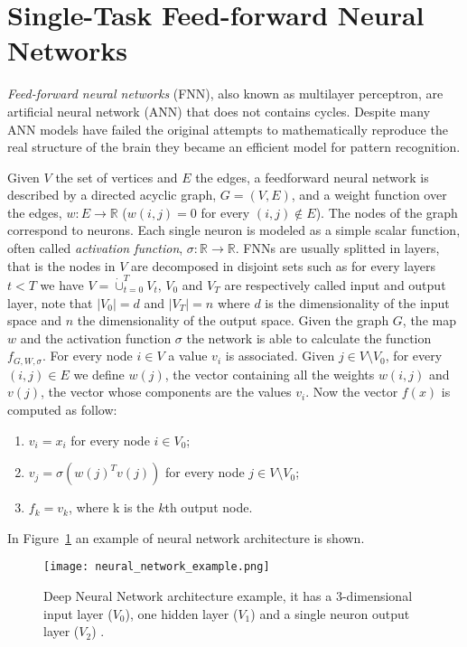 \section{Single-Task Feed-forward Neural Networks} \label{sec:singletaskNN}
\emph{Feed-forward neural networks} (FNN), also known as multilayer perceptron, are artificial neural network (ANN) that does not contains cycles. Despite many ANN models have failed the original attempts to mathematically reproduce the real structure of the brain they became an efficient model for pattern recognition. 

Given $V$ the set of vertices and $E$ the edges, a feedforward neural network is described by a directed acyclic graph, $G =
(V,E)$, and a weight function over the edges, $w : E \to \mathbb R$ ($w(i, j) = 0$
for every $(i, j) \notin E$). The nodes of the graph correspond to neurons. Each
single neuron is modeled as a simple scalar function, often called \emph{activation function},  $ \sigma : \mathbb R \to
\mathbb R$. FNNs are usually
splitted in layers, that is the nodes in $V$ are decomposed in disjoint sets such
as for every layers $t < T$ we have $V = \dot\cup_{t = 0}^T V_t$, $V_0$ and
$V_T$ are respectively called input and output layer, note that $|V_0| = d$ and
$|V_T| = n$ where $d$ is the dimensionality of the input space and $n$ the
dimensionality of the output space. Given the graph $G$, the map $w$ and the
activation function $\sigma$ the network is able to calculate the function
$f_{G,W,\sigma}$. For every node $i \in V$ a value $v_i$ is associated. Given $j
\in V \setminus V_0$, for every $(i, j) \in E$ we define $w(j)$, the vector containing all
the weights $w(i, j)$ and $v(j)$, the vector whose components are the values $v_i$. Now the
vector $f(x)$ is computed as follow:
\begin{enumerate}
    \item $v_i = x_i$ for every node $i \in V_0$;
    \item $v_j = \sigma(w(j)^T v(j))$ for every node $j \in V \setminus V_0$;
    \item $f_k = v_k$, where k is the $k$th output node.
\end{enumerate}
In Figure~\ref{fig:neural_network_example} an example of neural network architecture is
shown. \cite{ShwartzUnderstadningML, BishopML}
\begin{figure}[ht]
\texttt{[image: neural\_network\_example.png]}
\caption{Deep Neural Network architecture example, it has a 3-dimensional input layer
($V_0$), one hidden layer ($V_1$) and a single neuron output layer ($V_2$)
\cite{ShwartzUnderstadningML}.} 
\label{fig:neural_network_example}
\end{figure}

